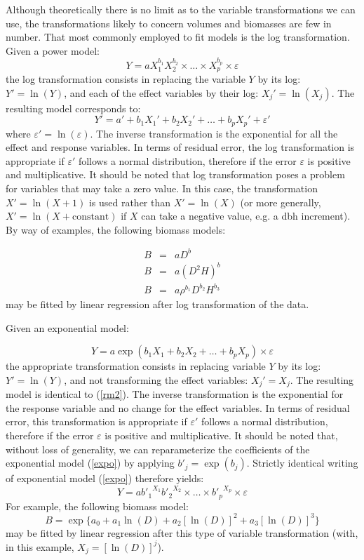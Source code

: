 Although theoretically there is no limit as to the variable transformations we can use, the transformations likely to concern volumes and biomasses are few in number. That most commonly employed to fit models is the log transformation. Given a power model:
\[
Y=aX_1^{b_1}X_2^{b_2}\times\ldots\times X_p^{b_p}\times\varepsilon
\]
the log transformation consists in replacing the variable $Y$ by its log: $Y'=\ln(Y)$, and each of the effect variables by their log: $X_j'=\ln(X_j)$. The resulting model corresponds to:
\begin{equation}
Y'=a'+b_1X_1'+b_2X_2'+\ldots+b_pX_p'+\varepsilon'\label{rm2}
\end{equation}
where $\varepsilon'=\ln(\varepsilon)$. The inverse transformation is the exponential for all the effect and response variables. In terms of residual error, the log transformation is appropriate if $\varepsilon'$ follows a normal distribution, therefore if the error $\varepsilon$ is positive and multiplicative. It should be noted that log transformation poses a problem for variables that may take a zero value. In this case, the transformation $X'=\ln(X+1)$
is used rather than $X'=\ln(X)$ (or more generally,
$X'=\ln(X+\mathrm{constant})$ if $X$ can take a negative value, e.g. a dbh increment). By way of examples, the following biomass models:

\begin{eqnarray*}
B &=& aD^b\\ %
B &=& a(D^2H)^b\\ %
B &=& a\rho^{b_1}D^{b_2}H^{b_3}
\end{eqnarray*}
may be fitted by linear regression after log transformation of the data.

Given an exponential model:

\begin{equation}
Y=a\exp(b_1X_1+b_2X_2+\ldots+b_pX_p)\times\varepsilon\label{expo}
\end{equation}
the appropriate transformation consists in replacing variable $Y$
by its log: $Y'=\ln(Y)$, and not transforming the effect variables: $X_j'=X_j$. 
The resulting model is identical to (\ref{rm2}). 
The inverse transformation is the exponential for the response variable and no change for the effect variables. In terms of residual error, this transformation is appropriate if $\varepsilon'$ follows a normal distribution, therefore if the error $\varepsilon$ is positive and multiplicative. It should be noted that, without loss of generality, we can reparameterize the coefficients of the exponential model (\ref{expo}) by applying $b'_j=\exp(b_j)$. Strictly identical writing of exponential model (\ref{expo}) therefore yields:
\[
Y=a{b'_1}^{X_1}{b'_2}^{X_2}\times\ldots\times{b'_p}^{X_p}\times\varepsilon
\]
For example, the following biomass model:
\[
B=\exp\{a_0+a_1\ln(D)+a_2[\ln(D)]^2+a_3[\ln(D)]^3\}
\]
may be fitted by linear regression after this type of variable transformation (with, in this example, $X_j=[\ln(D)]^j$).

